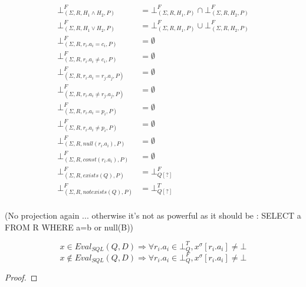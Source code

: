 \begin{mydef}
	\begin{align*}
		\bot^F_{(\Sigma,R,H_1 \land H_2,P)} & = \bot^F_{(\Sigma,R,H_1,P)} \cap \bot^F_{(\Sigma,R,H_2,P)} \\
		\bot^F_{(\Sigma,R,H_1 \lor H_2,P)} & = \bot^F_{(\Sigma,R,H_1,P)} \cup \bot^F_{(\Sigma,R,H_2,P)} \\
		\bot^F_{(\Sigma,R,r_i.a_i = c_i,P)} & =\emptyset \\
		\bot^F_{(\Sigma,R,r_i.a_i \neq c_i,P)} & = \emptyset \\
		\bot^F_{(\Sigma,R,r_i.a_i = r_j.a_j,P)} & = \emptyset \\
		\bot^F_{(\Sigma,R,r_i.a_i \neq r_j.a_j,P)} & = \emptyset \\
		\bot^F_{(\Sigma,R,r_i.a_i = p_i,P)} & = \emptyset\\
		\bot^F_{(\Sigma,R,r_i.a_i \neq p_i,P)} & = \emptyset \\
		\bot^F_{(\Sigma,R,null(r_i.a_i),P)} & = \emptyset \\
		\bot^F_{(\Sigma,R,const(r_i.a_i),P)} & = \emptyset \\
		\bot^F_{(\Sigma,R,exists(Q),P)} & = \bot^F_{Q[?]} \\
		\bot^F_{(\Sigma,R,notexists(Q),P)} & = \bot^T_{Q[?]}\\
	\end{align*}
\end{mydef}

(No projection again ... otherwise it's not as powerful as it should be : SELECT a FROM R WHERE a=b or null(B))
\begin{myprop}
	$$x \in Eval_{SQL}(Q,D)  \Rightarrow \forall r_i.a_i \in \bot^T_Q, x^\sigma[r_i.a_i] \neq \bot$$
	$$x \notin Eval_{SQL}(Q,D)  \Rightarrow \forall r_i.a_i \in \bot^F_Q, x^\sigma[r_i.a_i] \neq \bot$$
\end{myprop}

\begin{proof}
		
\end{proof}

